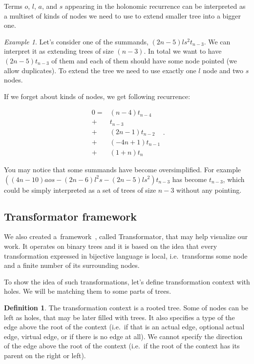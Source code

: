 \documentclass[final]{article}
\theoremstyle{definition}
\newtheorem{definition}{Definition}[subsection]
\theoremstyle{definition}
\theoremstyle{remark}
\newtheorem{example}{Example}[subsection]
\begin{document}
Terms \(o\), \(l\), \(a\), and \(s\) appearing in the holonomic recurrence can be interpreted as a multiset of kinds of nodes we need to use to extend smaller tree into a bigger one.

\begin{example}
    Let's consider one of the summands, \((2n - 5) l s^2 t_{n - 3}\). We can interpret it as extending trees of size \((n - 3)\). In total we want to have \((2n - 5) t_{n - 3}\) of them and each of them should have some node pointed (we allow duplicates). To extend the tree we need to use exactly one \(l\) node and two \(s\) nodes.
\end{example}

If we forget about kinds of nodes, we get following recurrence:

\[\begin{array}{rl}
        0 =& (n - 4) t_{n - 4}\\
        +& t_{n - 3}\\
        +& (2 n - 1) t_{n - 2}\\
        +& (-4 n + 1) t_{n - 1}\\
        +& (1 + n) t_{n}
\end{array}.\]

You may notice that some summands have become oversimplified. For example \(((4 n - 10) a o s - (2 n - 6) l^2 s - (2 n - 5) l s^2) t_{n - 3}\) has become \(t_{n-3}\), which could be simply interpreted as a set of trees of size \(n - 3\) without any pointing.

\subsection{Transformator framework}%
\label{sub:the_framework}

We also created a~framework~\cite{transformator}, called Transformator, that may help visualize our work. It operates on binary trees and it is based on the idea that every transformation expressed in bijective language is local, i.e.~transforms some node and a finite number of its surrounding nodes.

To show the idea of such transformations, let's define transformation context with holes. We will be matching them to some parts of trees.

\begin{definition}
    The transformation context is a rooted tree. Some of nodes can be left as holes, that may be later filled with trees. It also specifies a type of the edge above the root of the context (i.e.~if that is an actual edge, optional actual edge, virtual edge, or if there is no edge at all). We cannot specify the direction of the edge above the root of the context (i.e.~if the root of the context has its parent on the right or left).
\end{definition}
\end{document}
